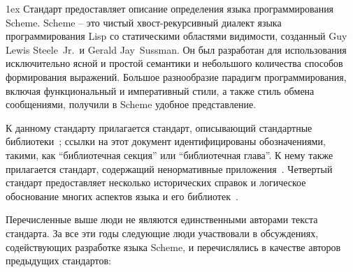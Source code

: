 \documentclass[twoside,twocolumn]{algol60}
\begin{document}
{{\parskip 1ex
Стандарт предоставляет описание определения языка программирования Scheme. Scheme -- это чистый
хвост-рекурсивный диалект языка программирования Lisp со статическими областями видимости,
созданный Guy Lewis Steele~Jr.\ и Gerald Jay~Sussman. Он был разработан для использования
исключительно ясной и простой семантики и небольшого количества способов формирования
выражений. Большое разнообразие парадигм программирования, включая функциональный и императивный
стили, а также стиль обмена сообщениями, получили в Scheme удобное представление.

К данному стандарту прилагается стандарт, описывающий стандартные
библиотеки~\cite{R6RS-libraries}; ссылки на этот документ идентифицированы обозначениями,
такими, как ``библиотечная секция'' или ``библиотечная глава''. К нему также прилагается
стандарт, содержащий ненормативные приложения~\cite{R6RS-appendices}. Четвертый стандарт
предоставляет несколько исторических справок и логическое обоснование многих аспектов языка и
его библиотек~\cite{R6RS-rationale}.

\medskip

Перечисленные выше люди не являются единственными авторами текста стандарта. За все эти годы
следующие люди участвовали в обсуждениях, содействующих разработке языка Scheme, и перечислялись
в качестве авторов предыдущих стандартов:

}}
\end{document}
